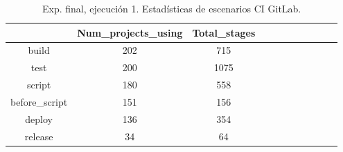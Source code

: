 \begin{table}[h]
  \centering
  \caption{Exp. final, ejecución 1. Estadísticas de escenarios CI GitLab.}
  \label{tab:tabla_f_1_7}

\begin{footnotesize}
\renewcommand{\arraystretch}{1.5} %
\begin{tabular}{ccccccccccc}
  \hline
  {} &  Num\_projects\_using &  Total\_stages \\
  \hline
  build                      &                 202 &           715 \\
  test                       &                 200 &          1075 \\
  script                     &                 180 &           558 \\
  before\_script              &                 151 &           156 \\
  deploy                     &                 136 &           354 \\
  release                    &                  34 &            64 \\

\end{tabular}
\end{footnotesize}
\end{table}
